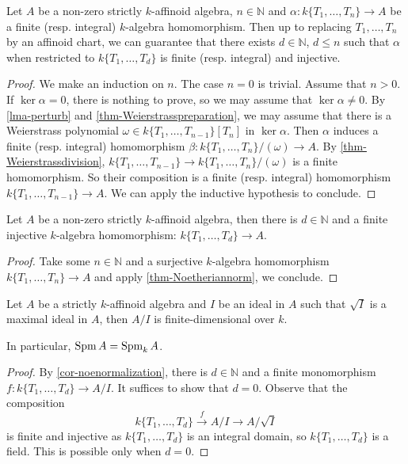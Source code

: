 \begin{thm}\label{thm-Noetheriannorm}
    Let $A$ be a non-zero strictly $k$-affinoid algebra, $n\in \mathbb{N}$ and $\alpha:k\{T_1,\ldots,T_n\}\rightarrow A$ be a finite (resp. integral) $k$-algebra homomorphism. Then up to replacing $T_1,\ldots,T_n$ by an affinoid chart, we can guarantee that there exists $d\in \mathbb{N}$, $d\leq n$ such that $\alpha$ when restricted to $k\{T_1,\ldots,T_d\}$ is finite (resp. integral) and injective.
\end{thm}
\begin{proof}
    We make an induction on $n$. The case $n=0$ is trivial. Assume that $n>0$. If $\ker \alpha=0$, there is nothing to prove, so we may assume that $\ker \alpha\neq 0$. By \cref{lma-perturb} and \cref{thm-Weierstrasspreparation}, we may assume that there is a Weierstrass polynomial $\omega\in k\{T_1,\ldots,T_{n-1}\}[T_n]$ in $\ker \alpha$. Then $\alpha$ induces a finite (resp. integral) homomorphism $\beta:k\{T_1,\ldots,T_n\}/(\omega)\rightarrow A$. By \cref{thm-Weierstrassdivision}, $k\{T_1,\ldots,T_{n-1}\}\rightarrow k\{T_1,\ldots,T_n\}/(\omega)$ is a finite homomorphism. So their composition is a finite (resp. integral) homomorphism $k\{T_1,\ldots,T_{n-1}\}\rightarrow A$. We can apply the inductive hypothesis to conclude.
\end{proof}
\begin{corollary}\label{cor-noenormalization}
    Let $A$ be a non-zero strictly $k$-affinoid algebra, then there is $d\in \mathbb{N}$ and a finite injective $k$-algebra homomorphism: $k\{T_1,\ldots,T_d\}\rightarrow A$.
\end{corollary}
\begin{proof}
    Take some $n\in \mathbb{N}$ and a surjective $k$-algebra homomorphism $k\{T_1,\ldots,T_n\}\rightarrow A$ and apply \cref{thm-Noetheriannorm}, we conclude.
\end{proof}


\begin{corollary}\label{cor-affinoidquotientfinite}
    Let $A$ be a strictly $k$-affinoid algebra and $I$ be an ideal in $A$ such that $\sqrt{I}$ is a maximal ideal in $A$, then $A/I$ is finite-dimensional over $k$.

    In particular, $\operatorname{Spm} A=\operatorname{Spm}_k A$.
\end{corollary}
\begin{proof}
    By \cref{cor-noenormalization}, there is $d\in \mathbb{N}$ and a finite monomorphism $f:k\{T_1,\ldots,T_d\}\rightarrow A/I$. It suffices to show that $d=0$. Observe that the composition 
    \[
        k\{T_1,\ldots,T_d\}\xrightarrow{f} A/I\rightarrow A/\sqrt{I}
    \]
    is finite and injective as $k\{T_1,\ldots,T_d\}$ is an integral domain, so $k\{T_1,\ldots,T_d\}$ is a field. This is possible only when $d=0$. 
\end{proof}


